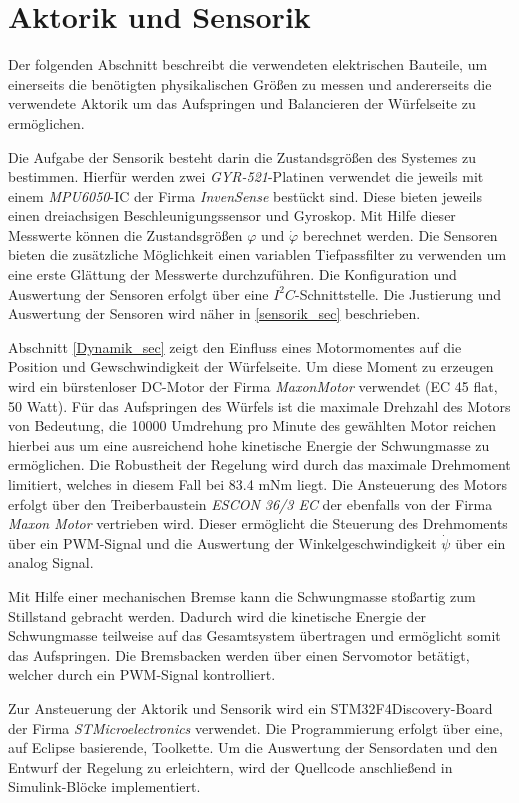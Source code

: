 \section{Aktorik und Sensorik}
Der folgenden Abschnitt beschreibt die verwendeten elektrischen Bauteile, um einerseits die benötigten physikalischen Größen zu messen und andererseits die verwendete Aktorik um das Aufspringen und Balancieren der Würfelseite zu ermöglichen. 

Die Aufgabe der Sensorik besteht darin die Zustandsgrößen des Systemes zu bestimmen. Hierfür werden zwei \textit{GYR-521}-Platinen verwendet die jeweils mit einem \textit{MPU6050}-IC der Firma \textit{InvenSense} bestückt sind. Diese bieten jeweils einen dreiachsigen Beschleunigungssensor und Gyroskop. Mit Hilfe dieser Messwerte können die Zustandsgrößen $\varphi$ und $\dot{\varphi}$ berechnet werden. Die Sensoren bieten die zusätzliche Möglichkeit einen variablen Tiefpassfilter zu verwenden um eine erste Glättung der Messwerte durchzuführen. Die Konfiguration und Auswertung der Sensoren erfolgt über eine $I^2C$-Schnittstelle. Die Justierung und Auswertung der Sensoren wird näher in \ref{sensorik_sec} beschrieben.

Abschnitt \ref{Dynamik_sec} zeigt den Einfluss eines Motormomentes auf die Position und Gewschwindigkeit der Würfelseite. Um diese Moment zu erzeugen wird ein bürstenloser DC-Motor der Firma \textit{MaxonMotor} verwendet (EC 45 flat, 50 Watt). Für das Aufspringen des Würfels ist die maximale Drehzahl des Motors von Bedeutung, die 10000 Umdrehung pro Minute des gewählten Motor reichen hierbei aus um eine ausreichend hohe kinetische Energie der Schwungmasse zu ermöglichen. Die Robustheit der Regelung wird durch das maximale Drehmoment limitiert, welches in diesem Fall bei 83.4 mNm liegt. Die Ansteuerung des Motors erfolgt über den Treiberbaustein \textit{ESCON 36/3 EC} der ebenfalls von der Firma \textit{Maxon Motor} vertrieben wird. Dieser ermöglicht die Steuerung des Drehmoments über ein PWM-Signal und die Auswertung der Winkelgeschwindigkeit $\dot{\psi}$ über ein analog Signal.

Mit Hilfe einer mechanischen Bremse kann die Schwungmasse stoßartig zum Stillstand gebracht werden. Dadurch wird die kinetische Energie der Schwungmasse teilweise auf das Gesamtsystem übertragen und ermöglicht somit das Aufspringen. Die Bremsbacken werden über einen Servomotor betätigt, welcher durch ein PWM-Signal kontrolliert. 

Zur Ansteuerung der Aktorik und Sensorik wird ein STM32F4Discovery-Board der Firma \textit{STMicroelectronics} verwendet. Die Programmierung erfolgt über eine, auf Eclipse basierende, Toolkette. Um die Auswertung der Sensordaten und den Entwurf der Regelung zu erleichtern, wird der Quellcode anschließend in Simulink-Blöcke implementiert.
